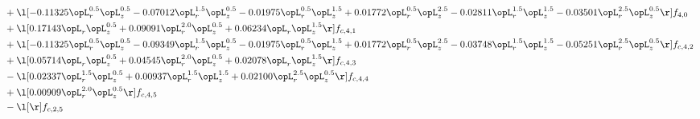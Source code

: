 \begin{alignat}{2}
& + \l[  -0.11325 \opL_r^{0.5} \opL_z^{0.5}   -0.07012 \opL_r^{1.5} \opL_z^{0.5}   -0.01975 \opL_r^{0.5} \opL_z^{1.5} +  0.01772 \opL_r^{0.5} \opL_z^{2.5}   -0.02811 \opL_r^{1.5} \opL_z^{1.5}   -0.03501 \opL_r^{2.5} \opL_z^{0.5}  \r] f_{4,0} \nonumber \\ 
& + \l[  0.17143 \opL_r \opL_z^{0.5} +  0.09091 \opL_r^{2.0} \opL_z^{0.5} +  0.06234 \opL_r \opL_z^{1.5}  \r] f_{c,4,1} \nonumber \\ 
& + \l[  -0.11325 \opL_r^{0.5} \opL_z^{0.5}   -0.09349 \opL_r^{1.5} \opL_z^{0.5}   -0.01975 \opL_r^{0.5} \opL_z^{1.5} +  0.01772 \opL_r^{0.5} \opL_z^{2.5}   -0.03748 \opL_r^{1.5} \opL_z^{1.5}   -0.05251 \opL_r^{2.5} \opL_z^{0.5}  \r] f_{c,4,2} \nonumber \\ 
& + \l[  0.05714 \opL_r \opL_z^{0.5} +  0.04545 \opL_r^{2.0} \opL_z^{0.5} +  0.02078 \opL_r \opL_z^{1.5}  \r] f_{c,4,3} \nonumber \\ 
& - \l[  0.02337 \opL_r^{1.5} \opL_z^{0.5} +  0.00937 \opL_r^{1.5} \opL_z^{1.5} +  0.02100 \opL_r^{2.5} \opL_z^{0.5}  \r] f_{c,4,4} \nonumber \\ 
& + \l[  0.00909 \opL_r^{2.0} \opL_z^{0.5}  \r] f_{c,4,5} \nonumber \\ 
& - \l[  \r] f_{c,2,5} \nonumber \\ 
\end{alignat} 


